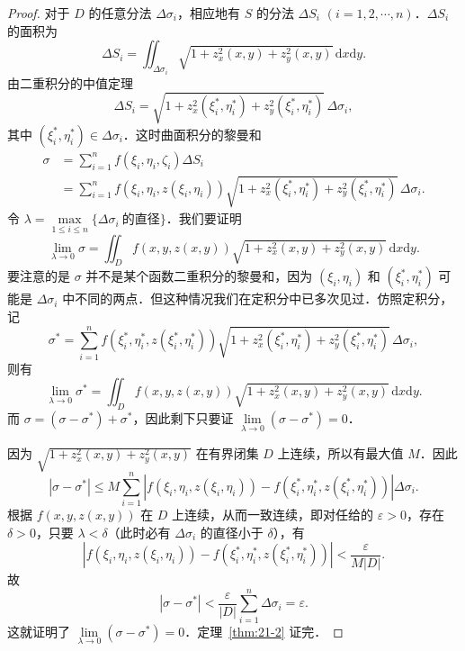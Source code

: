 \begin{proof}
对于 $D$ 的任意分法 $\Delta\sigma_{i}$，相应地有 $S$ 的分法 $\Delta S_{i}$ $(i=1,2,\cdots,n)$．$\Delta S_{i}$ 的面积为
\[
\Delta S_{i}=\iint_{\Delta\sigma_{i}}\sqrt{1+z_{x}^{2}(x,y)+z_{y}^{2}(x,y)}\,\mathrm{d}x\mathrm{d}y.
\]
由二重积分的中值定理
\[
\Delta S_{i}=\sqrt{1+z_{x}^{2}(\xi_{i}^{*},\eta_{i}^{*})+z_{y}^{2}(\xi_{i}^{*},\eta_{i}^{*})}\,\Delta\sigma_{i},
\]
其中 $(\xi_{i}^{*},\eta_{i}^{*})\in\Delta\sigma_{i}$．这时曲面积分的黎曼和
\[
\begin{aligned}
\sigma&=\sum_{i=1}^{n}f(\xi_{i},\eta_{i},\zeta_{i})\Delta S_{i}\\
&=\sum_{i=1}^{n}f(\xi_{i},\eta_{i},z(\xi_{i},\eta_{i}))\sqrt{1+z_{x}^{2}(\xi_{i}^{*},\eta_{i}^{*})+z_{y}^{2}(\xi_{i}^{*},\eta_{i}^{*})}\,\Delta\sigma_{i}.
\end{aligned}
\]
令 $\lambda=\max\limits_{1\leqslant i\leqslant n}\{\Delta\sigma_{i}\ \text{的直径}\}$．我们要证明
\[
\lim_{\lambda\to0}\sigma=\iint_{D}f(x,y,z(x,y))\sqrt{1+z_{x}^{2}(x,y)+z_{y}^{2}(x,y)}\,\mathrm{d}x\mathrm{d}y.
\]
要注意的是 $\sigma$ 并不是某个函数二重积分的黎曼和，因为 $(\xi_{i},\eta_{i})$ 和 $(\xi_{i}^{*},\eta_{i}^{*})$ 可能是 $\Delta\sigma_{i}$ 中不同的两点．但这种情况我们在定积分中已多次见过．仿照定积分，记
\[
\sigma^{*}=\sum_{i=1}^{n}f(\xi_{i}^{*},\eta_{i}^{*},z(\xi_{i}^{*},\eta_{i}^{*}))\sqrt{1+z_{x}^{2}(\xi_{i}^{*},\eta_{i}^{*})+z_{y}^{2}(\xi_{i}^{*},\eta_{i}^{*})}\,\Delta\sigma_{i},
\]
则有
\[
\lim_{\lambda\to0}\sigma^{*}=\iint_{D}f(x,y,z(x,y))\sqrt{1+z_{x}^{2}(x,y)+z_{y}^{2}(x,y)}\,\mathrm{d}x\mathrm{d}y.
\]
而 $\sigma=(\sigma-\sigma^{*})+\sigma^{*}$，因此剩下只要证 $\lim\limits_{\lambda\to0}(\sigma-\sigma^{*})=0$．

因为 $\sqrt{1+z_{x}^{2}(x,y)+z_{y}^{2}(x,y)}$ 在有界闭集 $D$ 上连续，所以有最大值 $M$．因此
\[
|\sigma-\sigma^{*}|\leqslant M\sum_{i=1}^{n}\left|f(\xi_{i},\eta_{i},z(\xi_{i},\eta_{i}))-f(\xi_{i}^{*},\eta_{i}^{*},z(\xi_{i}^{*},\eta_{i}^{*}))\right|\Delta\sigma_{i}.
\]
根据 $f(x,y,z(x,y))$ 在 $D$ 上连续，从而一致连续，即对任给的 $\varepsilon>0$，存在 $\delta>0$，只要 $\lambda<\delta$（此时必有 $\Delta\sigma_{i}$ 的直径小于 $\delta$），有
\[
\left|f(\xi_{i},\eta_{i},z(\xi_{i},\eta_{i}))-f(\xi_{i}^{*},\eta_{i}^{*},z(\xi_{i}^{*},\eta_{i}^{*}))\right|<\frac{\varepsilon}{M|D|}.
\]
故
\[
|\sigma-\sigma^{*}|<\frac{\varepsilon}{|D|}\sum_{i=1}^{n}\Delta\sigma_{i}=\varepsilon.
\]
这就证明了 $\lim\limits_{\lambda\to0}(\sigma-\sigma^{*})=0$．定理~\ref{thm:21-2} 证完．
\end{proof}

